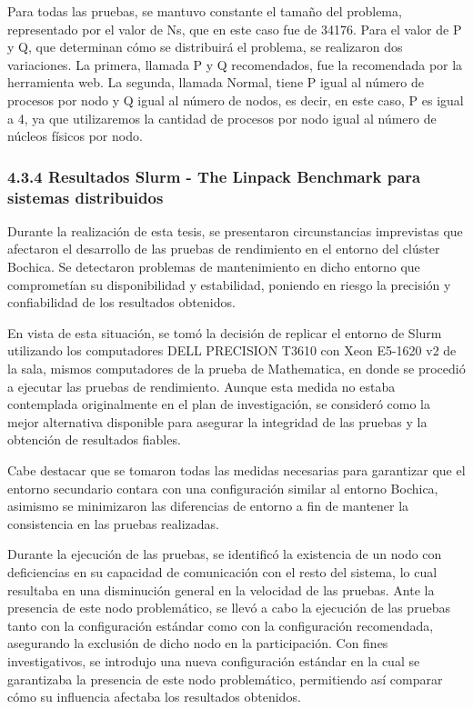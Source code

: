 \begin{spacing}{1.5}
\begin{lstlisting}[language=bash]
\end{lstlisting}

  Para todas las pruebas, se mantuvo constante el tamaño del problema, representado por el valor de Ns, que en este caso fue de 34176. Para el valor de P y Q, que determinan cómo se distribuirá el problema, se realizaron dos variaciones. La primera, llamada P y Q recomendados, fue la recomendada por la herramienta web. La segunda, llamada Normal, tiene P igual al número de procesos por nodo y Q igual al número de nodos, es decir, en este caso, P es igual a 4, ya que utilizaremos la cantidad de procesos por nodo igual al número de núcleos físicos por nodo.

  \subsubsection{4.3.4 Resultados Slurm - The Linpack Benchmark para sistemas distribuidos}

  Durante la realización de esta tesis, se presentaron circunstancias imprevistas que afectaron el desarrollo de las pruebas de rendimiento en el entorno del clúster Bochica. Se detectaron problemas de mantenimiento en dicho entorno que comprometían su disponibilidad y estabilidad, poniendo en riesgo la precisión y confiabilidad de los resultados obtenidos.

  En vista de esta situación, se tomó la decisión de replicar el entorno de Slurm utilizando los computadores DELL PRECISION T3610 con Xeon E5-1620 v2 de la sala, mismos computadores de la prueba de Mathematica, en donde se procedió a ejecutar las pruebas de rendimiento. Aunque esta medida no estaba contemplada originalmente en el plan de investigación, se consideró como la mejor alternativa disponible para asegurar la integridad de las pruebas y la obtención de resultados fiables.

  Cabe destacar que se tomaron todas las medidas necesarias para garantizar que el entorno secundario contara con una configuración similar al entorno Bochica, asimismo se minimizaron las diferencias de entorno a fin de mantener la consistencia en las pruebas realizadas.

  Durante la ejecución de las pruebas, se identificó la existencia de un nodo con deficiencias en su capacidad de comunicación con el resto del sistema, lo cual resultaba en una disminución general en la velocidad de las pruebas. Ante la presencia de este nodo problemático, se llevó a cabo la ejecución de las pruebas tanto con la configuración estándar como con la configuración recomendada, asegurando la exclusión de dicho nodo en la participación. Con fines investigativos, se introdujo una nueva configuración estándar en la cual se garantizaba la presencia de este nodo problemático, permitiendo así comparar cómo su influencia afectaba los resultados obtenidos.


\end{spacing}
